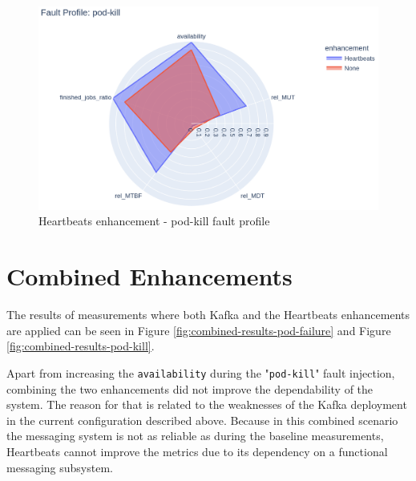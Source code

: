 \begin{figure}[h]
	\centering
	\includegraphics[width=140mm, keepaspectratio]{figures/heartbeats_with_base_pod-kill.png}
	\caption{Heartbeats enhancement - pod-kill fault profile}
	\label{fig:heartbeats-results-pod-kill}
\end{figure}

\section{Combined Enhancements}

The results of measurements where both Kafka and the Heartbeats enhancements are applied can be seen in Figure \ref{fig:combined-results-pod-failure} and Figure \ref{fig:combined-results-pod-kill}.

Apart from increasing the \texttt{availability} during the "\texttt{pod-kill}" fault injection, combining the two enhancements did not improve the dependability of the system. The reason for that is related to the weaknesses of the Kafka deployment in the current configuration described above. Because in this combined scenario the messaging system is not as reliable as during the baseline measurements, Heartbeats cannot improve the metrics due to its dependency on a functional messaging subsystem.


